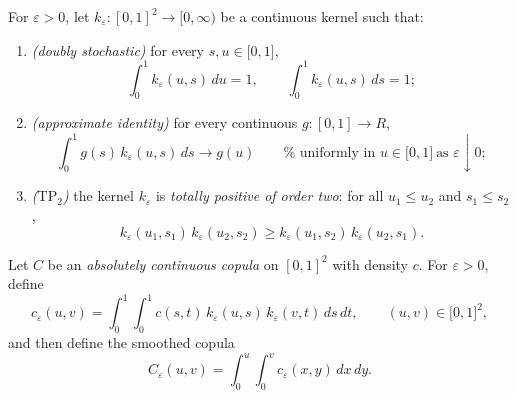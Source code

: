 \documentclass[onecolumn]{article}
\newtheorem{definition}[theorem]{Definition}
\let\olddefinition\definition
\let\endolddefinition\enddefinition
\renewenvironment{definition}{\olddefinition\normalfont}{\endolddefinition}
\begin{document}
\begin{definition}
\label{smoothing-kernel} For $\varepsilon >0$, let $k_{\varepsilon
}:[0,1]^{2}\rightarrow \lbrack 0,\infty )$ be a continuous kernel such that:

\begin{enumerate}
\item[(i)] \emph{(doubly stochastic)} for every $s,u\in \lbrack 0,1]$, 
\begin{equation}
\int_{0}^{1}k_{\varepsilon }(u,s)\,du=1,\qquad \int_{0}^{1}k_{\varepsilon
}(u,s)\,ds=1;  \label{821}
\end{equation}

\item[(ii)] \emph{(approximate identity)} for every continuous $%
g:[0,1]\rightarrow R$, 
\begin{equation}
\int_{0}^{1}g(s)\,k_{\varepsilon }(u,s)\,ds\longrightarrow g(u)\qquad \text{%
uniformly in }u\in \lbrack 0,1]\ \text{as }\varepsilon \downarrow 0;
\label{822}
\end{equation}

\item[(iii)] \emph{($\mathrm{TP}_{2}$)} the kernel $k_{\varepsilon }$ is 
\textit{totally positive of order two}: for all $u_{1}\leq u_{2}$ and $%
s_{1}\leq s_{2}$, 
\begin{equation}
k_{\varepsilon }(u_{1},s_{1})\,k_{\varepsilon }(u_{2},s_{2})\geq
k_{\varepsilon }(u_{1},s_{2})\,k_{\varepsilon }(u_{2},s_{1}).  \label{822.1}
\end{equation}
\end{enumerate}
\end{definition}

\begin{definition}
\label{smoothed-copula-clean} Let $C$ be an \textit{absolutely continuous
copula} on $[0,1]^{2}$ with density $c$. For $\varepsilon >0$, define 
\begin{equation}
c_{\varepsilon }(u,v)=\int_{0}^{1}\int_{0}^{1}c(s,t)\,k_{\varepsilon
}(u,s)\,k_{\varepsilon }(v,t)\,ds\,dt,\qquad (u,v)\in \lbrack 0,1]^{2},
\label{822.2}
\end{equation}%
and then define the smoothed copula 
\begin{equation}
C_{\varepsilon }(u,v)=\int_{0}^{u}\int_{0}^{v}c_{\varepsilon }(x,y)\,dx\,dy.
\label{822.3}
\end{equation}
\end{definition}
\end{document}

